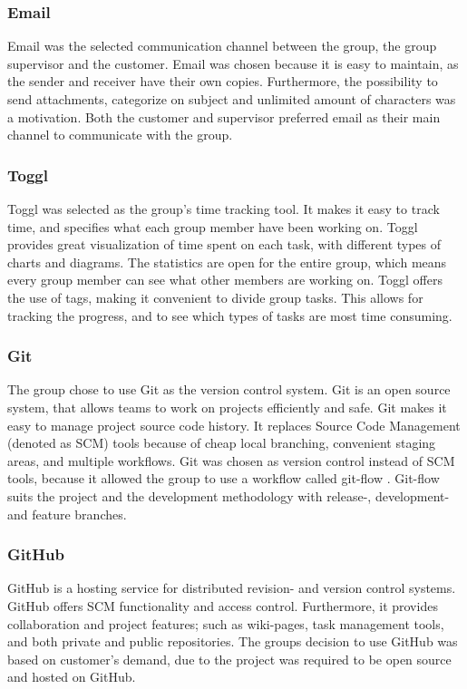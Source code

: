 \subsubsection{Email}
Email was the selected communication channel between the group, the group supervisor and the customer.
Email was chosen because it is easy to maintain, as the sender and receiver have their own copies. Furthermore, the possibility to send attachments, categorize on subject and unlimited amount of characters was a motivation. Both the customer and supervisor preferred email as their main channel to communicate with the group.  

\subsubsection{Toggl}
Toggl \cite{Toggl} was selected as the group's time tracking tool. It makes it easy to track time, and specifies what each group member have been working on. Toggl provides great visualization of time spent on each task, with different types of charts and diagrams. The statistics are open for the entire group, which means every group member can see what other members are working on. Toggl offers the use of tags, making it convenient to divide group tasks. This allows for tracking the progress, and to see which types of tasks are most time consuming.  

\subsubsection{Git}
The group chose to use Git \cite{Git} as the version control system. Git is an open source system, that allows teams to work on projects efficiently and safe. Git makes it easy to manage project source code history. It replaces Source Code Management (denoted as SCM) tools because of cheap local branching, convenient staging areas, and multiple workflows. Git was chosen as version control instead of SCM tools, because it allowed the group to use a workflow called git-flow \cite{gitFlow}. Git-flow suits the project and the development methodology with release-, development- and feature branches. 

\subsubsection{GitHub}
\label{GitHub}
GitHub\cite{GitHub} is a hosting service for distributed revision- and version control systems. GitHub offers SCM functionality and access control. Furthermore, it provides collaboration and project features; such as wiki-pages, task management tools, and both private and public repositories. The groups decision to use GitHub was based on customer's demand, due to the project was required to be open source and hosted on GitHub. 


